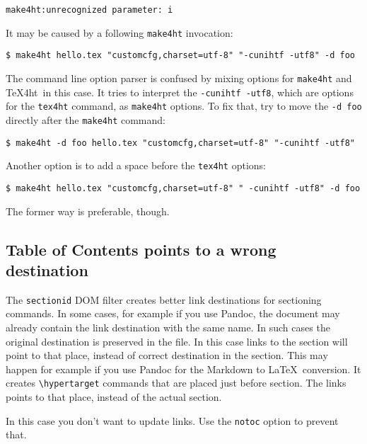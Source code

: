 \begin{verbatim}
make4ht:unrecognized parameter: i
\end{verbatim}

It may be caused by a following \texttt{make4ht} invocation:

\begin{verbatim}
$ make4ht hello.tex "customcfg,charset=utf-8" "-cunihtf -utf8" -d foo
\end{verbatim}

The command line option parser is confused by mixing options for
\texttt{make4ht} and \TeX4ht~in this case. It tries to interpret the
\texttt{-cunihtf\ -utf8}, which are options for the \texttt{tex4ht}
command, as \texttt{make4ht} options. To fix that, try to move the
\texttt{-d\ foo} directly after the \texttt{make4ht} command:

\begin{verbatim}
$ make4ht -d foo hello.tex "customcfg,charset=utf-8" "-cunihtf -utf8"
\end{verbatim}

Another option is to add a space before the \texttt{tex4ht} options:

\begin{verbatim}
$ make4ht hello.tex "customcfg,charset=utf-8" " -cunihtf -utf8" -d foo
\end{verbatim}

The former way is preferable, though.

\hypertarget{table-of-contents-points-to-a-wrong-destination}{%
\subsection{Table of Contents points to a wrong
destination}\label{table-of-contents-points-to-a-wrong-destination}}

The \texttt{sectionid} DOM filter creates better link destinations for
sectioning commands. In some cases, for example if you use Pandoc, the
document may already contain the link destination with the same name. In
such cases the original destination is preserved in the file. In this
case links to the section will point to that place, instead of correct
destination in the section. This may happen for example if you use
Pandoc for the Markdown to \LaTeX~conversion. It creates
\texttt{\textbackslash{}hypertarget} commands that are placed just
before section. The links points to that place, instead of the actual
section.

In this case you don't want to update links. Use the \texttt{notoc}
option to prevent that.

